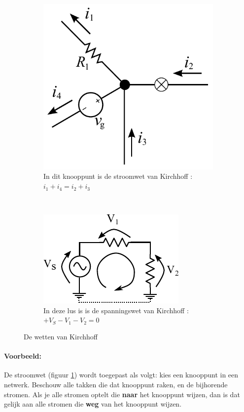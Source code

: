 \documentclass{article}
\begin{document}
			\begin{figure}[htbp!]
				\centering
				\begin{subfigure}[b]{0.45\linewidth}
					\centering
					\includegraphics[scale=0.5]{kcl.pdf}
					\caption{In dit knooppunt is de stroomwet van Kirchhoff : $i_1 + i_4 = i_2+i_3$}
					\label{subfig:kcl}
				\end{subfigure}
				~
				\begin{subfigure}[b]{0.45\linewidth}
					\centering
					\includegraphics{kvl.pdf}
					\caption{In deze lus is is de spanningswet van Kirchhoff : $ + V_S - V_1 - V_2 = 0$}
					\label{subfig:kvl}
				\end{subfigure}
			\caption{De wetten van Kirchhoff}
			\label{fig:kirchoff}
			\end{figure}

			\paragraph*{Voorbeeld:} De stroomwet (figuur \ref{subfig:kcl}) wordt toegepast als volgt: kies een knooppunt in een netwerk. Beschouw alle takken die dat knooppunt raken, en de bijhorende stromen. Als je alle stromen optelt die \textbf{naar} het knooppunt wijzen, dan is dat gelijk aan alle stromen die \textbf{weg} van het knooppunt wijzen.
\end{document}
